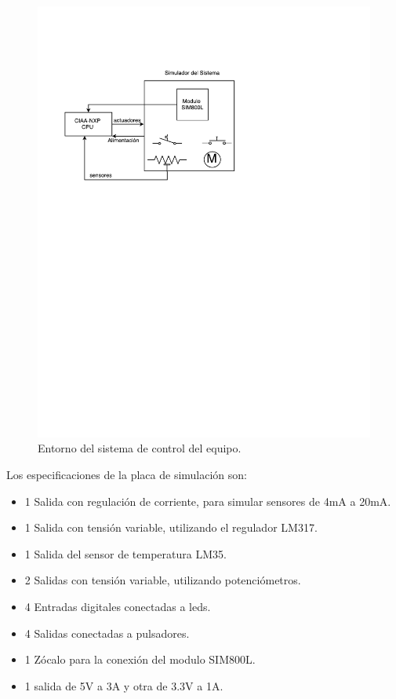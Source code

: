 \begin{figure}[!htb]
  \centering
  \includegraphics[page=1,scale=1,clip,trim=1.5cm 16.5cm 5.5cm 3.5cm]{./Figures/ciaa_placa_base.pdf}
  \caption{Entorno del sistema de control del equipo.}
  \label{fig:diagrama_simulado}
\end{figure}


Los especificaciones de la placa de simulación son:

\begin{itemize}
  \item 1 Salida con regulación de corriente, para simular sensores de 4mA a 20mA.
  \item 1 Salida con tensión variable, utilizando el regulador LM317.
  \item 1 Salida del sensor de temperatura LM35.
  \item 2 Salidas con tensión variable, utilizando potenciómetros. 
  \item 4 Entradas digitales conectadas a leds.
  \item 4 Salidas conectadas a pulsadores. 
  \item 1 Zócalo para la conexión del modulo SIM800L. 
  \item 1 salida de 5V a 3A y otra de 3.3V a 1A. 
\end{itemize}

